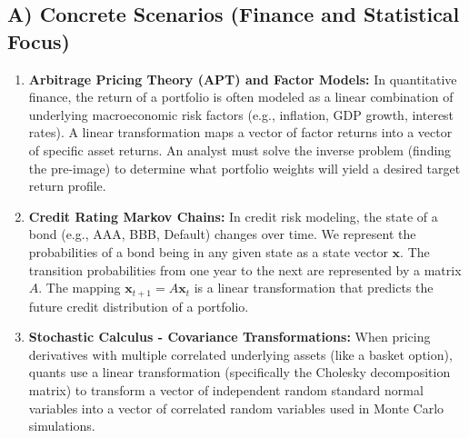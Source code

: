 \documentclass[11pt]{article}
\begin{document}
\subsection{A) Concrete Scenarios (Finance and Statistical Focus)}
\begin{enumerate}
    \item \textbf{Arbitrage Pricing Theory (APT) and Factor Models:} In quantitative finance, the return of a portfolio is often modeled as a linear combination of underlying macroeconomic risk factors (e.g., inflation, GDP growth, interest rates). A linear transformation maps a vector of factor returns into a vector of specific asset returns. An analyst must solve the inverse problem (finding the pre-image) to determine what portfolio weights will yield a desired target return profile.
    \item \textbf{Credit Rating Markov Chains:} In credit risk modeling, the state of a bond (e.g., AAA, BBB, Default) changes over time. We represent the probabilities of a bond being in any given state as a state vector $\mathbf{x}$. The transition probabilities from one year to the next are represented by a matrix $A$. The mapping $\mathbf{x}_{t+1} = A\mathbf{x}_t$ is a linear transformation that predicts the future credit distribution of a portfolio.
    \item \textbf{Stochastic Calculus - Covariance Transformations:} When pricing derivatives with multiple correlated underlying assets (like a basket option), quants use a linear transformation (specifically the Cholesky decomposition matrix) to transform a vector of independent random standard normal variables into a vector of correlated random variables used in Monte Carlo simulations.
\end{enumerate}
\end{document}
